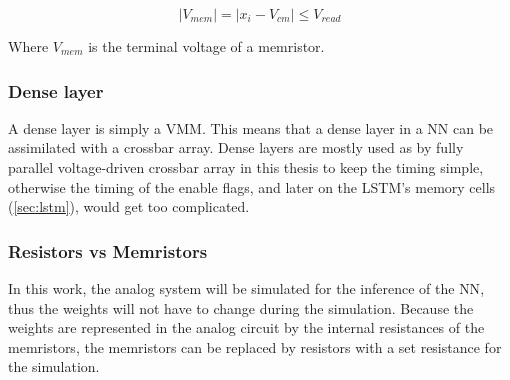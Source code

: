 \begin{equation}\label{eq:memThres}
  |V_{mem}|= |x_i-V_{cm}|\le V_{read}
\end{equation}

Where $V_{mem}$ is the terminal voltage of a memristor.

\subsubsection{Dense layer}

A dense layer is simply a \ac{VMM}. This means that a dense layer in a \ac{NN} can be assimilated with a crossbar array. Dense layers are mostly used as by fully parallel voltage-driven crossbar array in this thesis to keep the timing simple, otherwise the timing of the enable flags, and later on the \ac{LSTM}'s memory cells (\cref{sec:lstm}), would get too complicated.

\subsubsection{Resistors vs Memristors}

In this work, the analog system will be simulated for the inference of the \ac{NN}, thus the weights will not have to change during the simulation. Because the weights are represented in the analog circuit by the internal resistances of the memristors, the memristors can be replaced by resistors with a set resistance for the simulation.
